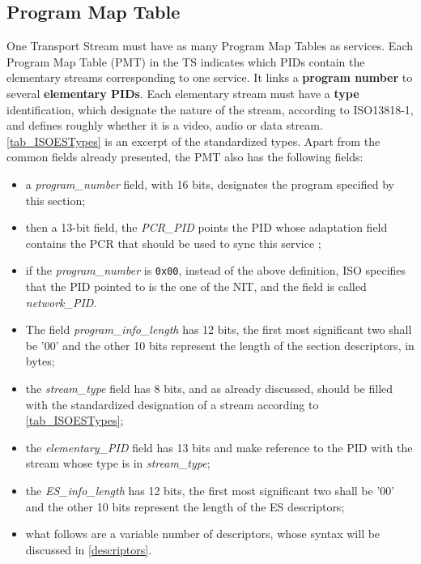 \documentclass[
	12pt,				%
	openright,			%
	twoside,			%
	a4paper,			%
	brazil,
	french,				%
	english
	]{abntex2}
\begin{document}
\subsection{Program Map Table}
\label{PMT}

One Transport Stream must have as many Program Map Tables as services. Each Program Map Table (PMT) in the TS indicates which PIDs contain the elementary streams corresponding to one service. It links a \textbf{program number} to several \textbf{elementary PIDs}. Each elementary stream must have a \textbf{type} identification, which designate the nature of the stream, according to ISO13818-1, and defines roughly whether it is a video, audio or data stream. \autoref{tab_ISOESTypes} is an excerpt of the standardized types. Apart from the common fields already presented, the PMT also has the following fields:

\begin{itemize}
\item{a \textit{program\_number} field, with 16 bits, designates the program specified by this section;}
\item{then a 13-bit field, the \textit{PCR\_PID} points the PID whose adaptation field contains the PCR that should be used to sync this service ;}
\item{if the \textit{program\_number} is \texttt{0x00}, instead of the above definition, ISO specifies that the PID pointed to is the one of the NIT, and the field is called \textit{network\_PID}.}
\item{The field \textit{program\_info\_length} has 12 bits, the first most significant two shall be '00' and the other 10 bits represent the length of the section descriptors, in bytes;}
\item{the \textit{stream\_type} field has 8 bits, and as already discussed, should be filled with the standardized designation of a stream according to \autoref{tab_ISOESTypes};}
\item{the \textit{elementary\_PID} field has 13 bits and make reference to the PID with the stream whose type is in \textit{stream\_type};}
\item{the \textit{ES\_info\_length} has 12 bits, the first most significant two shall be '00' and the other 10 bits represent the length of the ES descriptors;}
\item{what follows are a variable number of descriptors, whose syntax will be discussed in \autoref{descriptors}.}
\end{itemize}
\end{document}
